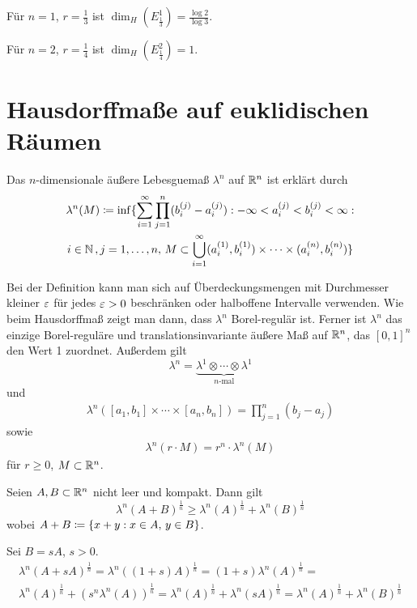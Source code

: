 \documentclass[a4paper,twoside,DIV15,BCOR12mm]{scrbook}
\begin{document}
\begin{beispiele}
\item Für $n=1$, $r=\frac13$ ist $\dim_H(E_{\frac13}^1) = \frac{\log 2}{\log 3}$.
\item Für $n=2$, $r=\frac14$ ist $\dim_H(E_{\frac14}^2) = 1$.
\end{beispiele}

\section{Hausdorffmaße auf euklidischen Räumen}

\begin{definition}
Das $n$-dimensionale äußere Lebesguemaß $\lambda^n$ auf $\mathbb{R}^n$ ist erklärt durch
\begin{multline*}
\lambda^n(M) \da \inf\{\sum_{i=1}^\infty \prod_{j=1}^n (b_i^{(j)} - a_i^{(j)}) : -\infty < a_i^{(j)} < b_i^{(j)} < \infty : \\ i\in\MdN\,,j=1,\ldots,n,\,
M\subset \bigcup_{i=1}^\infty (a_i^{(1)}, b_i^{(1)})\times \cdots \times (a_i^{(n)},b_i^{(n)})\}
\end{multline*}
\end{definition}

Bei der Definition kann man sich auf Überdeckungsmengen mit Durchmesser kleiner $\varepsilon$ für jedes $\varepsilon>0$ beschränken oder halboffene Intervalle verwenden. Wie beim Hausdorffmaß zeigt man dann, dass $\lambda^n$ Borel-regulär ist. Ferner ist $\lambda^n$ das einzige Borel-reguläre und translationsinvariante äußere Maß auf $\mathbb{R}^n$, das $[0,1]^n$ den Wert 1 zuordnet. Außerdem gilt
\[
\lambda^n = \underbrace{\lambda^1\otimes \cdots \otimes \lambda^1}_{\text{$n$-mal}}
\]
und
\begin{align*}
\lambda^n([a_1,b_1]\times \cdots \times [a_n,b_n]) = \prod_{j=1}^n (b_j-a_j)
\end{align*}
sowie
\begin{align*}
\lambda^n(r\cdot M) = r^n\cdot \lambda^n(M)
\end{align*}
für $r\ge 0$, $M\subset \mathbb{R}^n$.

\begin{satz}
\label{satz:2.26}
Seien $A,B\subset \mathbb{R}^n$ nicht leer und kompakt. Dann gilt \[
\lambda^n(A+B)^{\frac1n} \ge \lambda^n(A)^{\frac1n} + \lambda^n(B)^{\frac1n}
\]
wobei $A+B \da \{x+y : x\in A,\, y\in B\}$.
\end{satz}

\begin{beispiel}
Sei $B= sA$, $s>0$.
\begin{multline*}
\lambda^n(A + sA)^{\frac1n} = \lambda^n( (1+s)A )^{\frac1n} = (1+s)\lambda^n(A)^{\frac1n} =
\\
\lambda^n(A)^{\frac1n} + (s^n\lambda^n(A))^{\frac1n} = \lambda^n(A)^{\frac1n} + \lambda^n(sA)^{\frac1n} = \lambda^n(A)^{\frac1n} + \lambda^n(B)^{\frac1n}
\end{multline*}
\end{beispiel}
\end{document}
